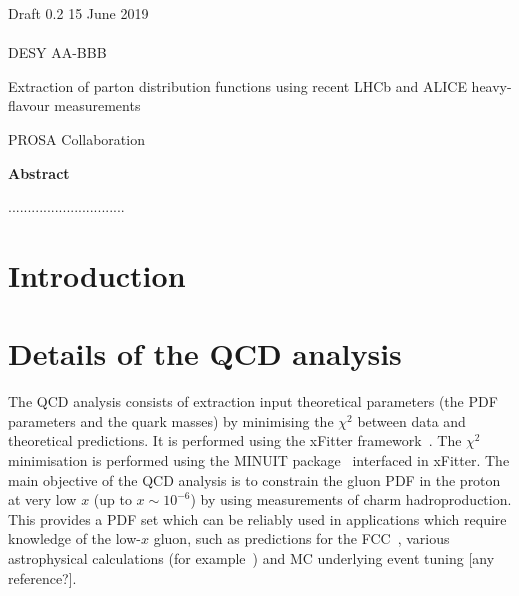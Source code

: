 \documentclass[12pt]{article}
\begin{document}
\begin{titlepage}
\noindent
Draft 0.2  \hfill 15 June 2019\\
\\
DESY AA-BBB %
\\

\vspace{1.3cm}

\begin{center}
  {\bf 

\large

Extraction of parton distribution functions using recent LHCb and ALICE heavy-flavour measurements
  }
  \vspace{1.5cm}

  {\large
    PROSA Collaboration
  }\\

  \vspace{1.2cm}

\end{center}
  \vspace{2.4cm}
\begin{center}
\large
{\bf Abstract}
\vspace{-0.2cm}
\end{center}
..............................
\vfill
\end{titlepage}


%
%
\newpage

\section{Introduction}
\label{sect:intro}

\section{Details of the QCD analysis}
\label{sec:qcdanalysis}
The QCD analysis consists of extraction input theoretical parameters (the PDF parameters and the quark masses) by minimising the $\chi^2$ between  data and theoretical predictions. 
It is performed using the xFitter framework~\cite{Alekhin:2014irh}. 
The $\chi^2$ minimisation is performed using the MINUIT package~\cite{James:1975dr} interfaced in xFitter.
The main objective of the QCD analysis is to constrain the gluon PDF in the proton at very low $x$ (up to $x \sim 10^{-6}$) by using measurements of charm hadroproduction. This provides a PDF set which can be reliably used in applications which require knowledge of the low-$x$ gluon, such as predictions for the FCC~\cite{Mangano:2016jyj}, various astrophysical calculations (for example~\cite{Garzelli:2015psa,Gauld:2015yia,Gauld:2015kvh,Garzelli:2016xmx,Bertone:2018dse}) and MC underlying event tuning [any reference?].
\end{document}
